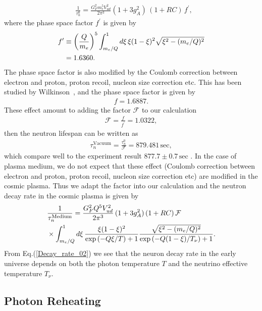 \begin{align}
&\frac{1}{\tau_n^0}=\frac{G^2_Fm_e^5V^2_{ud}}{2\pi^3}(1+3g^2_A)\,(1+RC)\,f^\prime,
\end{align}
where the phase space factor $f^\prime$ is given by
\begin{align}
f^\prime&\equiv\left(\frac{Q}{m_e}\right)^5\int^1_{m_e/Q}d\xi\,{\xi(1-\xi)^2}\sqrt{\xi^2-(m_e/Q)^2}
\notag\\&=1.6360.
\end{align}
The phase space factor is also modified by the Coulomb correction between electron and proton, proton recoil, nucleon size correction etc. This has been studied by Wilkinson~\cite{Wilkinson:1982hu}, and the phase space factor is given by~\cite{Czarnecki:2018okw,Czarnecki:2004cw,Wilkinson:1982hu}
\begin{align}
f=1.6887.
\end{align}
These effect amount to adding the factor $\mathcal{F}$ to our calculation
\begin{align}
\mathcal{F}=\frac{f}{f^\prime}=1.0322,
\end{align}
then the neutron lifespan can be written as 
\begin{align}
\tau^{\mathrm{Vacuum}}_n=\frac{\tau^0_n}{\mathcal{F}}=879.481\,\mathrm{sec},
\end{align}
which compare well to the experiment result $877.7\pm0.7\,\mathrm{sec}$ \cite{Pattie:2017vsj}. In the case of plasma medium, we do not expect that these effect (Coulomb correction between electron and proton, proton recoil, nucleon size correction etc) are modified in the cosmic plasma. Thus we adapt the factor into our calculation and the neutron decay rate in the cosmic plasma is given by
\begin{align}
\label{Decay_rate_02}
&\frac{1}{\tau_n^{\mathrm{Medium}}}=\frac{G^2_FQ^5V^2_{ud}}{2\pi^3}\,(1+3g^2_A)\,(1+RC)\,\mathcal{F}\\
&\times\int^1_{m_e/Q}d\xi\,\frac{\xi(1-\xi)^2}{\exp\left(-Q\xi/{T}\right)+1}\frac{\sqrt{\xi^2-(m_e/Q)^2}}{\exp\left(-Q(1-\xi)/T_\nu\right)+1}.\notag
\end{align}
From Eq.(\ref{Decay_rate_02}) we see that the neuron decay rate in the early universe depends on both the photon temperature $T$ and the neutrino effective temperature $T_\nu$.


\subsection{Photon Reheating}\label{Reheating}

